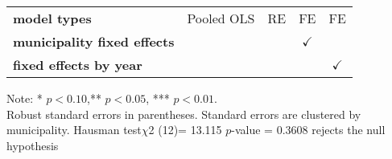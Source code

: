 \begin{table}[!htbp]
{\begin{threeparttable}
\begin{tabular}{lcccc}
\textbf{model types}                    & Pooled OLS      & RE            & FE            & FE                  \\
\textbf{municipality fixed effects }    &                 &               & $\checkmark$  &                     \\
\textbf{fixed effects by year}             &                 &               &               & $\checkmark$        \\
\midrule
 \end{tabular}
     \begin{tablenotes}
     Note: * \(p<0.10\),** \(p<0.05\), *** \(p<0.01\). \\ Robust standard errors in parentheses. Standard errors are clustered by municipality. Hausman test\ensuremath{\chi}2 (12)= 13.115 \ensuremath{p}-value = 0.3608 rejects the null hypothesis 
     \end{tablenotes}
     \end{threeparttable}
     }
\end{table}